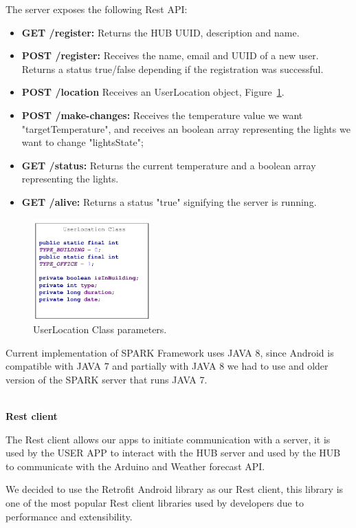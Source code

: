 The server exposes the following Rest API: 

\begin{itemize}
  \item \textbf{GET /register:} Returns the HUB UUID, description and name.
  \item \textbf{POST /register:} Receives the name, email and UUID of a new user. Returns a status true/false depending if the registration was successful.
  \item \textbf{POST /location} Receives an UserLocation object, Figure~\ref{user_location_class}.
  \item \textbf{POST /make-changes:} Receives the temperature value we want "targetTemperature", and receives an boolean array representing the lights we want to change "lightsState";
   \item \textbf{GET /status:} Returns the current temperature and a boolean array representing the lights.
   \item \textbf{GET /alive:} Returns a status "true" signifying the server is running.
\end{itemize}

\begin{figure}[h]
\centering
\includegraphics[width=0.4\textwidth]{Figures/userlocation_class}
\caption{UserLocation Class parameters.}
\label{user_location_class}
\end{figure}

Current implementation of SPARK Framework uses JAVA 8, since Android is compatible with JAVA 7 and partially with JAVA 8 we had to use and older version of the SPARK server that runs JAVA 7.  

\mbox{}\\
\textbf{Rest client}

The Rest client allows our apps to initiate communication with a server, it is used by the USER APP to interact with the HUB server and used by the HUB to communicate with the Arduino and Weather forecast API.

We decided to use the Retrofit Android library as our Rest client, this library is one of the most popular Rest client libraries used by developers due to performance and extensibility.



